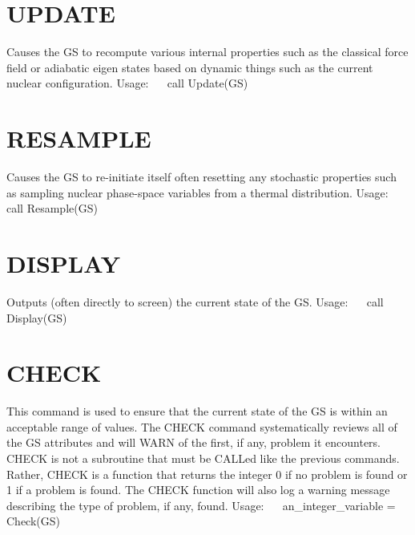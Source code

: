 \hypertarget{_interface_UPDATE}{}\section{U\+P\+D\+A\+TE}\label{_interface_UPDATE}
Causes the GS to recompute various internal properties such as the classical force field or adiabatic eigen states based on dynamic things such as the current nuclear configuration. Usage\+:~\newline
~\newline
 call Update(\+G\+S) ~\newline
\hypertarget{_interface_RESAMPLE}{}\section{R\+E\+S\+A\+M\+P\+LE}\label{_interface_RESAMPLE}
Causes the GS to re-\/initiate itself often resetting any stochastic properties such as sampling nuclear phase-\/space variables from a thermal distribution. Usage\+:~\newline
~\newline
 call Resample(\+G\+S)~\newline
\hypertarget{_interface_DISPLAY}{}\section{D\+I\+S\+P\+L\+AY}\label{_interface_DISPLAY}
Outputs (often directly to screen) the current state of the GS. Usage\+:~\newline
~\newline
 call Display(\+G\+S)~\newline
\hypertarget{_interface_CHECK}{}\section{C\+H\+E\+CK}\label{_interface_CHECK}
This command is used to ensure that the current state of the GS is within an acceptable range of values. The C\+H\+E\+CK command systematically reviews all of the GS attributes and will W\+A\+RN of the first, if any, problem it encounters. C\+H\+E\+CK is not a subroutine that must be C\+A\+L\+Led like the previous commands. Rather, C\+H\+E\+CK is a function that returns the integer 0 if no problem is found or 1 if a problem is found. The C\+H\+E\+CK function will also log a warning message describing the type of problem, if any, found. Usage\+:~\newline
~\newline
 an\+\_\+integer\+\_\+variable = Check(\+G\+S)~\newline
